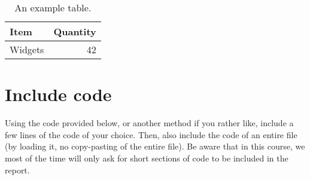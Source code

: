 \documentclass{article}
\begin{document}
	
	
	\begin{table}[H]
		\centering
		\begin{tabular}{l|r}
			Item & Quantity \\\hline
			Widgets & 42 
			
		\end{tabular}
		\caption{\label{tab:widgets}An example table.}
	\end{table}


	\section{Include code}
	
	Using the code provided below, or another method if you rather like, include a few lines of the code of your choice. Then, also include the code of an entire file (by loading it, no copy-pasting of the entire file). Be aware that in this course, we most of the time will only ask for short sections of code to be included in the report.
	
	
%	

 
\end{document}
